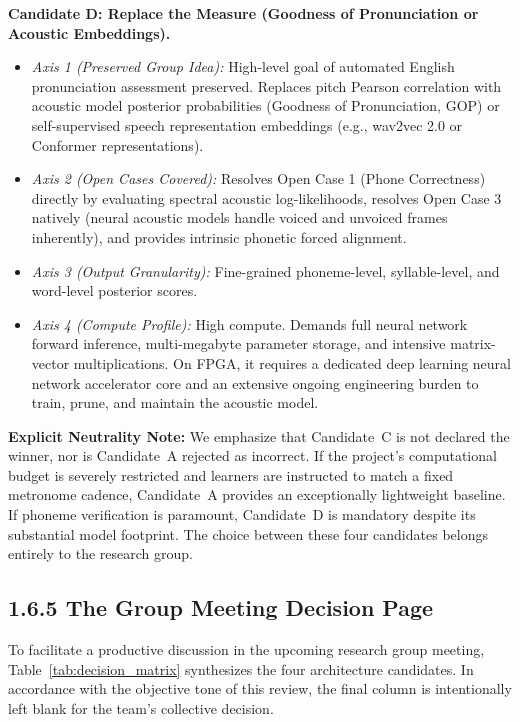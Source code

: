 \documentclass[11pt,a4paper]{article}
\begin{document}
\textbf{Candidate D: Replace the Measure (Goodness of Pronunciation or Acoustic Embeddings).}
\begin{itemize}
    \item \textit{Axis 1 (Preserved Group Idea):} High-level goal of automated English pronunciation assessment preserved. Replaces pitch Pearson correlation with acoustic model posterior probabilities (Goodness of Pronunciation, GOP) or self-supervised speech representation embeddings (e.g., wav2vec 2.0 or Conformer representations).
    \item \textit{Axis 2 (Open Cases Covered):} Resolves Open Case 1 (Phone Correctness) directly by evaluating spectral acoustic log-likelihoods, resolves Open Case 3 natively (neural acoustic models handle voiced and unvoiced frames inherently), and provides intrinsic phonetic forced alignment.
    \item \textit{Axis 3 (Output Granularity):} Fine-grained phoneme-level, syllable-level, and word-level posterior scores.
    \item \textit{Axis 4 (Compute Profile):} High compute. Demands full neural network forward inference, multi-megabyte parameter storage, and intensive matrix-vector multiplications. On FPGA, it requires a dedicated deep learning neural network accelerator core and an extensive ongoing engineering burden to train, prune, and maintain the acoustic model.
\end{itemize}

\textbf{Explicit Neutrality Note:} We emphasize that Candidate~C is not declared the winner, nor is Candidate~A rejected as incorrect. If the project's computational budget is severely restricted and learners are instructed to match a fixed metronome cadence, Candidate~A provides an exceptionally lightweight baseline. If phoneme verification is paramount, Candidate~D is mandatory despite its substantial model footprint. The choice between these four candidates belongs entirely to the research group.

\subsection*{1.6.5 The Group Meeting Decision Page}

To facilitate a productive discussion in the upcoming research group meeting, Table~\ref{tab:decision_matrix} synthesizes the four architecture candidates. In accordance with the objective tone of this review, the final column is intentionally left blank for the team's collective decision.
\end{document}
